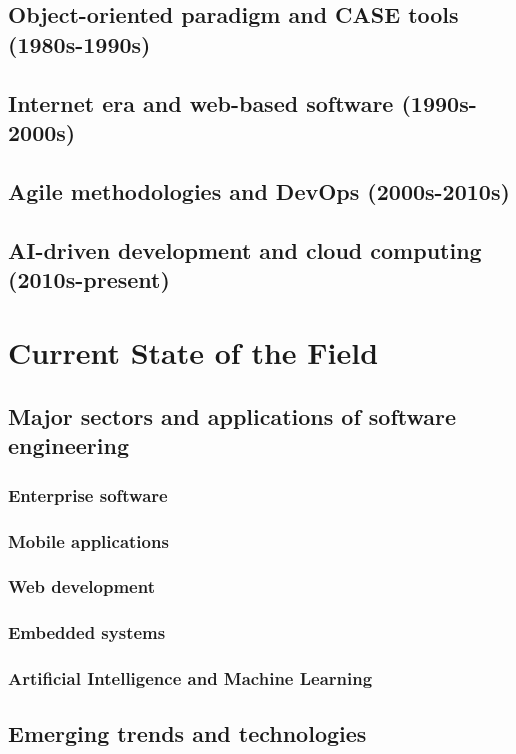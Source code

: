 \begin{refsection}
\begin{multicols}{2}
{\subsection{Object-oriented paradigm and CASE tools (1980s-1990s)}
\subsection{Internet era and web-based software (1990s-2000s)}
\subsection{Agile methodologies and DevOps (2000s-2010s)}
\subsection{AI-driven development and cloud computing (2010s-present)}

}
\newpage
\end{multicols}
\section{Current State of the Field}
\begin{multicols}{2}
{\small

\subsection{Major sectors and applications of software engineering}
\subsubsection{Enterprise software}
\subsubsection{Mobile applications}
\subsubsection{Web development}
\subsubsection{Embedded systems}
\subsubsection{Artificial Intelligence and Machine Learning}
\subsection{Emerging trends and technologies}
}
\end{multicols}
\end{refsection}
